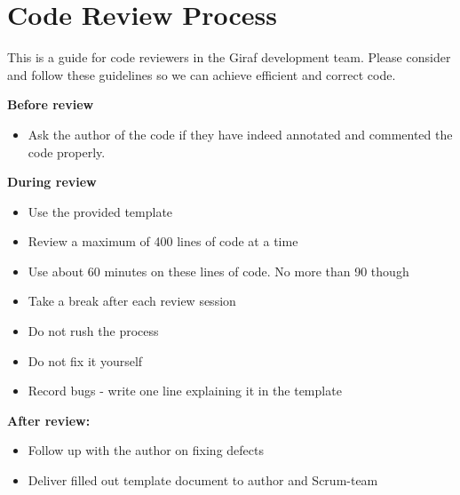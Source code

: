 \chapter{Code Review Process}\label{CRP}
This is a guide for code reviewers in the Giraf development team. Please
consider and follow these guidelines so we can achieve efficient and correct
code.\nl

\textbf{Before review}
  \begin{itemize}
    \item Ask the author of the code if they have indeed annotated and commented
    the code properly.
  \end{itemize}
\textbf{During review}
  \begin{itemize}
    \item Use the provided template
    \item Review a maximum of 400 lines of code at a time
    \item Use about 60 minutes on these lines of code. No more than 90 though
    \item Take a break after each review session
    \item Do not rush the process
    \item Do not fix it yourself
    \item Record bugs - write one line explaining it in the template 
  \end{itemize}
\textbf{After review:}
  \begin{itemize}
    \item Follow up with the author on fixing defects
    \item Deliver filled out template document to author and Scrum-team
  \end{itemize}
